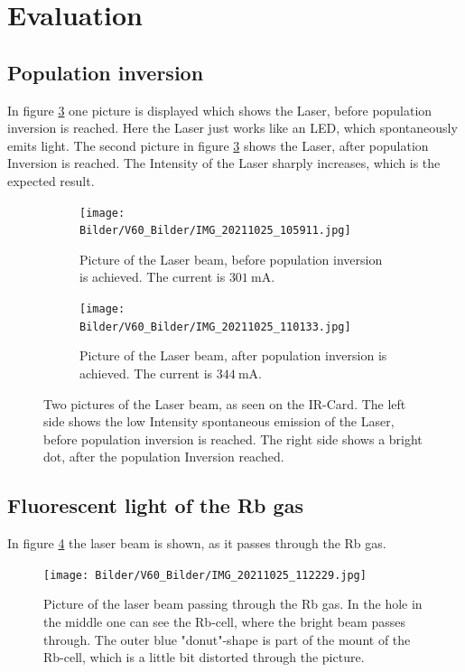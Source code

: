\section{Evaluation}
\subsection{ Population inversion}
In figure \ref{fig:population} one picture is displayed which shows the Laser, before population inversion is reached. Here the Laser just works like an LED, which spontaneously emits light. 
The second picture in figure \ref{fig:population} shows the Laser, after population Inversion is reached. The Intensity of the Laser sharply increases, which is the expected result.
\begin{figure}
    \centering
    \begin{subfigure}{.5\textwidth}
      \centering
      \texttt{[image: Bilder/V60\_Bilder/IMG\_20211025\_105911.jpg]}
      \caption{Picture of the Laser beam, before population inversion is achieved. The current is $\SI{301}{\milli\ampere}$.}
      \label{fig:su1}
    \end{subfigure}%
    \begin{subfigure}{.5\textwidth}
      \centering
      \texttt{[image: Bilder/V60\_Bilder/IMG\_20211025\_110133.jpg]}
      \caption{Picture of the Laser beam, after population inversion is achieved. The current is $\SI{344}{\milli\ampere}$.}
      \label{fig:su2}
    \end{subfigure}
    \caption{Two pictures of the Laser beam, as seen on the IR-Card. The left side shows the low Intensity spontaneous emission of the Laser, before population inversion is reached. The right side shows a bright dot, after the population Inversion reached.}
    \label{fig:population}
    \end{figure}

\subsection{ Fluorescent light of the Rb gas}
In figure \ref{fig:beam} the laser beam is shown, as it passes through the Rb gas. 
\begin{figure}
    \centering
    \texttt{[image: Bilder/V60\_Bilder/IMG\_20211025\_112229.jpg]}
    \caption{Picture of the laser beam passing through the Rb gas. In the hole in the middle one can see the Rb-cell, where the bright beam passes through. The outer blue "donut"-shape is part of the mount of the Rb-cell, which is a little bit distorted through the picture. }
    \label{fig:beam}
\end{figure}
